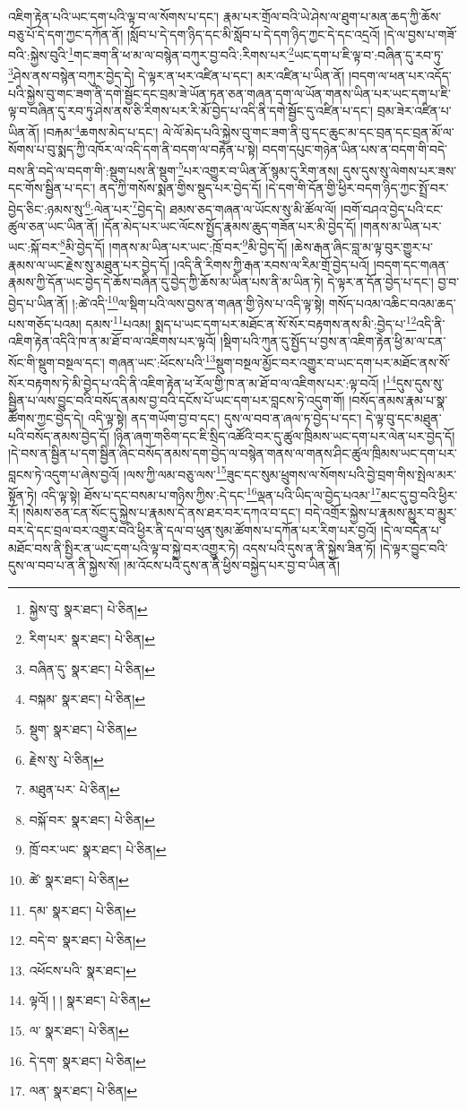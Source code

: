 འཇིག་རྟེན་པའི་ཡང་དག་པའི་ལྟ་བ་ལ་སོགས་པ་དང་། རྣམ་པར་གྲོལ་བའི་ཡེ་ཤེས་ལ་ཐུག་པ་མན་ཆད་ཀྱི་ཆོས་བཅུ་པོ་དེ་དག་ཀྱང་དཀོན་ནོ། །སློབ་པ་དེ་དག་ཉིད་དང་མི་སློབ་པ་དེ་དག་ཉིད་ཀྱང་དེ་དང་འདྲའོ། །དེ་ལ་བྱས་པ་གཟོ་བའི་:སྐྱེས་བུའི་\footnote{སྐྱེས་བུ་  སྣར་ཐང་།  པེ་ཅིན། }གང་ཟག་ནི་ཕ་མ་ལ་བསྙེན་བཀུར་བྱ་བའི་:རིགས་པར་\footnote{རིག་པར་  སྣར་ཐང་།  པེ་ཅིན། }ཡང་དག་པ་ཇི་ལྟ་བ་:བཞིན་དུ་རབ་ཏུ་\footnote{བཞིན་དུ་  སྣར་ཐང་།  པེ་ཅིན། }ཤེས་ནས་བསྙེན་བཀུར་བྱེད་དེ། དེ་ལྟར་ན་ཕར་འཛིན་པ་དང་། མར་འཛིན་པ་ཡིན་ནོ། །བདག་ལ་ཕན་པར་འདོད་པའི་སྐྱེས་བུ་གང་ཟག་ནི་དགེ་སྦྱོང་དང་བྲམ་ཟེ་ཡོན་ཏན་ཅན་གཞན་དག་ལ་ཡོན་གནས་ཡིན་པར་ཡང་དག་པ་ཇི་ལྟ་བ་བཞིན་དུ་རབ་ཏུ་ཤེས་ནས་ཅི་རིགས་པར་རི་མོ་བྱེད་པ་འདི་ནི་དགེ་སྦྱོང་དུ་འཛིན་པ་དང་། བྲམ་ཟེར་འཛིན་པ་ཡིན་ནོ། །བརྐམ་\footnote{བསྐམ་  སྣར་ཐང་།  པེ་ཅིན། }ཆགས་མེད་པ་དང་། ལེ་ལོ་མེད་པའི་སྐྱེས་བུ་གང་ཟག་ནི་བུ་དང་ཆུང་མ་དང་བྲན་དང་བྲན་མོ་ལ་སོགས་པ་བུ་སྨད་ཀྱི་འཁོར་ལ་འདི་དག་ནི་བདག་ལ་བརྟེན་པ་སྟེ། བདག་དཔུང་གཉེན་ཡིན་པས་ན་བདག་གི་བདེ་བས་ནི་བདེ་ལ་བདག་གི་:སྡུག་པས་ནི་སྡུག་\footnote{སྡུག་  སྣར་ཐང་།  པེ་ཅིན། }པར་འགྱུར་བ་ཡིན་ནོ་སྙམ་དུ་རིག་ནས། དུས་དུས་སུ་ལེགས་པར་ཟས་དང་གོས་སྦྱིན་པ་དང་། ནད་ཀྱི་གསོས་སྨན་གྱིས་སྡུད་པར་བྱེད་དོ། །དེ་དག་གི་དོན་གྱི་ཕྱིར་བདག་ཉིད་ཀྱང་སྤྲོ་བར་བྱེད་ཅིང་:ཉམས་སུ་\footnote{རྗེས་སུ་  པེ་ཅིན། }:ལེན་པར་\footnote{མཐུན་པར་  པེ་ཅིན། }བྱེད་དེ། ཐམས་ཅད་གཞན་ལ་ཡོངས་སུ་མི་ཚོལ་ལོ། །བགོ་བཤའ་བྱེད་པའི་ངང་ཚུལ་ཅན་ཡང་ཡིན་ནོ། །དོན་མེད་པར་ཡང་ལོངས་སྤྱོད་རྣམས་ཆུད་གཟོན་པར་མི་བྱེད་དོ། །གནས་མ་ཡིན་པར་ཡང་:སྐོ་བར་\footnote{བསྐོ་བར་  སྣར་ཐང་།  པེ་ཅིན། }མི་བྱེད་དོ། །གནས་མ་ཡིན་པར་ཡང་:ཁྲོ་བར་\footnote{ཁྲོ་བར་ཡང་  སྣར་ཐང་།  པེ་ཅིན། }མི་བྱེད་དོ། །ཆེས་རྒན་ཞིང་བླ་མ་ལྟ་བུར་གྱུར་པ་རྣམས་ལ་ཡང་རྗེས་སུ་མཐུན་པར་བྱེད་དོ། །འདི་ནི་རིགས་ཀྱི་རྒན་རབས་ལ་རིམ་གྲོ་བྱེད་པའོ། །བདག་དང་གཞན་རྣམས་ཀྱི་དོན་ཡང་བྱེད་དེ་ཆོས་བཞིན་དུ་བྱེད་ཀྱི་ཆོས་མ་ཡིན་པས་ནི་མ་ཡིན་ཏེ། དེ་ལྟར་ན་དོན་བྱེད་པ་དང་། བྱ་བ་བྱེད་པ་ཡིན་ནོ། །:ཚེ་འདི་\footnote{ཚེ་  སྣར་ཐང་།  པེ་ཅིན། }ལ་སྡིག་པའི་ལས་བྱས་ན་གཞན་གྱི་ཉེས་པ་འདི་ལྟ་སྟེ། གསོད་པའམ་འཆིང་བའམ་ཆད་པས་གཅོད་པའམ། དམས་\footnote{དམ་  སྣར་ཐང་།  པེ་ཅིན། }པའམ། སྨད་པ་ཡང་དག་པར་མཐོང་ན་སོ་སོར་བརྟགས་ནས་མི་:བྱེད་པ་\footnote{བདེ་བ་  སྣར་ཐང་།  པེ་ཅིན། }འདི་ནི་འཇིག་རྟེན་འདིའི་ཁ་ན་མ་ཐོ་བ་ལ་འཇིགས་པར་ལྟའོ། །སྡིག་པའི་ཀུན་དུ་སྤྱོད་པ་བྱས་ན་འཇིག་རྟེན་ཕྱི་མ་ལ་ངན་སོང་གི་སྡུག་བསྔལ་དང་། གཞན་ཡང་:ཕོངས་པའི་\footnote{འཕོངས་པའི་  སྣར་ཐང་། }སྡུག་བསྔལ་མྱོང་བར་འགྱུར་བ་ཡང་དག་པར་མཐོང་ནས་སོ་སོར་བརྟགས་ཏེ་མི་བྱེད་པ་འདི་ནི་འཇིག་རྟེན་ཕ་རོལ་གྱི་ཁ་ན་མ་ཐོ་བ་ལ་འཇིགས་པར་:ལྟ་བའོ། །\footnote{ལྟའོ། ། །  སྣར་ཐང་།  པེ་ཅིན། }དུས་དུས་སུ་སྦྱིན་པ་ལས་བྱུང་བའི་བསོད་ནམས་བྱ་བའི་དངོས་པོ་ཡང་དག་པར་བླངས་ཏེ་འདུག་གོ། །བསོད་ནམས་རྣམ་པ་སྣ་ཚོགས་ཀྱང་བྱེད་དེ། འདི་ལྟ་སྟེ། ནད་གཡོག་བྱ་བ་དང་། དུས་ལ་བབ་ན་ཞལ་ཏ་བྱེད་པ་དང་། དེ་ལྟ་བུ་དང་མཐུན་པའི་བསོད་ནམས་བྱེད་དོ། །ཉིན་ཞག་གཅིག་དང་ཇི་སྲིད་འཚོའི་བར་དུ་ཚུལ་ཁྲིམས་ཡང་དག་པར་ལེན་པར་བྱེད་དོ། །དེ་བས་ན་སྦྱིན་པ་དག་སྦྱིན་ཞིང་བསོད་ནམས་དག་བྱེད་ལ་བསྙེན་གནས་ལ་གནས་ཤིང་ཚུལ་ཁྲིམས་ཡང་དག་པར་བླངས་ཏེ་འདུག་པ་ཞེས་བྱའོ། །ལས་ཀྱི་ལམ་བཅུ་ལས་\footnote{ལ་  སྣར་ཐང་།  པེ་ཅིན། }ཟུང་དང་སུམ་ཕྲུགས་ལ་སོགས་པའི་བྱེ་བྲག་གིས་སྤེལ་མར་སྟོན་ཏེ། འདི་ལྟ་སྟེ། ཐོས་པ་དང་བསམ་པ་གཉིས་ཀྱིས་:དེ་དང་\footnote{དེ་དག་  སྣར་ཐང་།  པེ་ཅིན། }ལྡན་པའི་ཡིད་ལ་བྱེད་པའམ་\footnote{ལན་  སྣར་ཐང་།  པེ་ཅིན། }མང་དུ་བྱ་བའི་ཕྱིར་རོ། །སེམས་ཅན་ངན་སོང་དུ་སྐྱེས་པ་རྣམས་དེ་ནས་ཐར་བར་དཀའ་བ་དང་། བདེ་འགྲོར་སྐྱེས་པ་རྣམས་མྱུར་བ་མྱུར་བར་དེ་དང་བྲལ་བར་འགྱུར་བའི་ཕྱིར་ནི་དལ་བ་ཕུན་སུམ་ཚོགས་པ་དཀོན་པར་རིག་པར་བྱའོ། །དེ་ལ་བདེན་པ་མཐོང་བས་ནི་སྤྱིར་ན་ཡང་དག་པའི་ལྟ་བ་སྐྱེ་བར་འགྱུར་ཏེ། འདས་པའི་དུས་ན་ནི་སྐྱེས་ཟིན་ཏོ། །དེ་ལྟར་བྱུང་བའི་དུས་ལ་བབ་པ་ན་ནི་སྐྱེས་སོ། །མ་འོངས་པའི་དུས་ན་ནི་ཕྱིས་བསྐྱེད་པར་བྱ་བ་ཡིན་ནོ། 